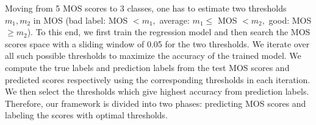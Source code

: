 Moving from 5 MOS scores to 3 classes, one has to estimate two thresholds $m_1, m_2$ in MOS (bad label: MOS  $ < m_1,$ average: $m_1 \le$ MOS $< m_2,$ good: MOS $\ge m_2$).
To this end, we first train the regression model and then search the MOS scores space with a sliding window of 0.05 for the two thresholds. 
We iterate over all such possible thresholds to maximize the accuracy of the trained model. 
We compute the true labels and prediction labels from the test MOS scores and predicted scores respectively using the corresponding thresholds in each iteration. 
We then select the thresholds which give highest accuracy from prediction labels.
Therefore, our framework is divided into two phases: predicting MOS scores and labeling the scores with optimal thresholds.

\begin{table}[t]
    \centering
    \caption{Models performance on Skype data}
    \label{class-skype}
\end{table}

